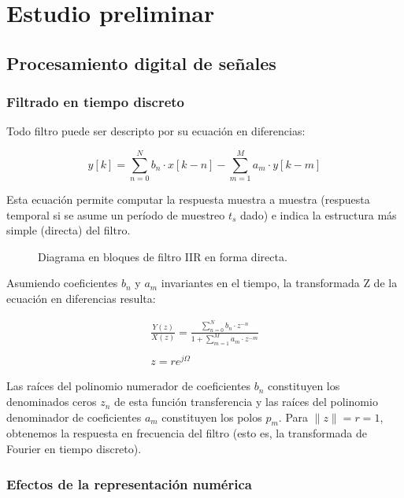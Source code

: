 \documentclass[11pt, journal]{IEEEtran}
\begin{document}
\section{Estudio preliminar}

\subsection{Procesamiento digital de señales}

\subsubsection{Filtrado en tiempo discreto}

Todo filtro puede ser descripto por su ecuación en diferencias:

\begin{equation*}
y[k] = \sum^N_{n = 0} b_n \cdot x[k - n] - \sum^M_{m = 1} a_m \cdot y[k - m]
\end{equation*}

Esta ecuación permite computar la respuesta muestra a muestra (respuesta
temporal si se asume un período de muestreo \(t_s\) dado) e indica la
estructura más simple (directa) del filtro.

\begin{figure}
  \centering
  \caption{Diagrama en bloques de filtro IIR en forma directa.}
\end{figure}

Asumiendo coeficientes \(b_n\) y \(a_m\) invariantes en el tiempo, la
transformada Z de la ecuación en diferencias resulta:

\begin{gather*}
  \frac{Y(z)}{X(z)} = \frac{\sum^N_{n = 0} b_n \cdot z^{-n}}{1 + \sum^M_{m = 1} a_m \cdot z^{-m}} \\\\
  z = re^{j\Omega}
\end{gather*}

Las raíces del polinomio numerador de coeficientes \(b_n\) constituyen
los denominados ceros \(z_n\) de esta función transferencia y las raíces
del polinomio denominador de coeficientes \(a_m\) constituyen los polos
\(p_m\). Para \(\|z\| = r = 1\), obtenemos la respuesta en frecuencia
del filtro (esto es, la transformada de Fourier en tiempo discreto).

\subsubsection{Efectos de la representación numérica}
\end{document}

